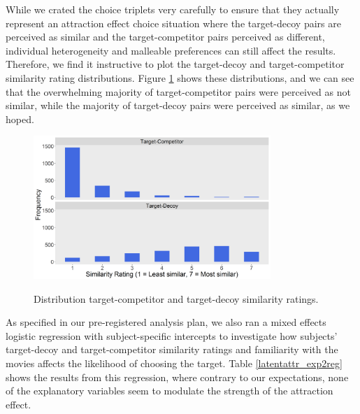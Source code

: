 \documentclass[12pt, a4paper]{article}
\begin{document}
While we crated the choice triplets very carefully to ensure that they actually represent an attraction effect choice situation where the target-decoy pairs are perceived as similar and the target-competitor pairs perceived as different, individual heterogeneity and malleable preferences can still affect the results. Therefore, we find it instructive to plot the target-decoy and target-competitor similarity rating distributions. Figure \ref{fig:exp2_similarityratings} shows these distributions, and we can see that the overwhelming majority of target-competitor pairs were perceived as not similar, while the majority of target-decoy pairs were perceived as similar, as we hoped.

\begin{figure}[htb!]
\centering
\captionsetup{justification=centering}
\caption{Distribution target-competitor and target-decoy similarity ratings.}
\includegraphics[width=0.8\textwidth]{exp2_similarityratings.png}
\label{fig:exp2_similarityratings}
\end{figure}

As specified in our pre-registered analysis plan, we also ran a mixed effects logistic regression with subject-specific intercepts to investigate how subjects' target-decoy and target-competitor similarity ratings and familiarity with the movies affects the likelihood of choosing the target. Table \ref{latentattr_exp2reg} shows the results from this regression, where contrary to our expectations, none of the explanatory variables seem to modulate the strength of the attraction effect.
\end{document}
